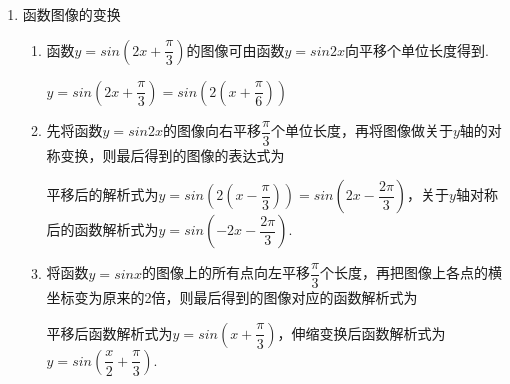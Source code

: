\begin{enumerate}
\begin{enumerate}
\begin{jieda}
            $f\left( x\right)  = \cos \sqrt{2}{\pi x},g\left( x\right)  = \cos x,{T}_{1} =  \sqrt{2},{T}_{2} = {2\pi },y = \cos \sqrt{2}{\pi x} + \cos x$ 不是周期函数; 所以命题甲为真命题
            
            对于命题乙: $f\left( x\right)  = \cos {5x} + \cos x,g\left( x\right)  =  - \cos x,{T}_{1} = {2\pi },{T}_{2} = {2\pi },f\left( x\right)  + g\left( x\right)  = \cos {5x},{T}_{3} = \dfrac{2\pi }{5}$ ,所以命题乙为假命题;

            \ps 经典反例$y = f(x), y = -f(x)$，周期相同，相加后没有最小正周期.
        \end{jieda}
    \end{enumerate}

\item 函数图像的变换
    \begin{enumerate}
        \item 函数$y = sin\left(2x+\dfrac{\pi}{3}\right)$的图像可由函数$y = sin2x$向平移个单位长度得到.
        \begin{jieda}
            $y = sin(2x+\dfrac{\pi}{3}) = sin(2(x+\dfrac{\pi}{6}))$
        \end{jieda}
        \item 先将函数$y = sin2x$的图像向右平移$\dfrac{\pi}{3}$个单位长度，再将图像做关于$y$轴的对称变换，则最后得到的图像的表达式为
        \begin{jieda}
            平移后的解析式为$y = sin(2(x-\dfrac{\pi}{3})) = sin(2x - \dfrac{2\pi}{3})$，关于$y$轴对称后的函数解析式为$y = sin(-2x - \dfrac{2\pi}{3})$.
        \end{jieda}
        \item 将函数$y = sinx$的图像上的所有点向左平移$\dfrac{\pi}{3}$个长度，再把图像上各点的横坐标变为原来的2倍，则最后得到的图像对应的函数解析式为
        \begin{jieda}
            平移后函数解析式为$y = sin(x + \dfrac{\pi}{3})$，伸缩变换后函数解析式为$y = sin(\dfrac{x}{2}+\dfrac{\pi}{3})$.
        \end{jieda}
    \end{enumerate}


\end{enumerate}
